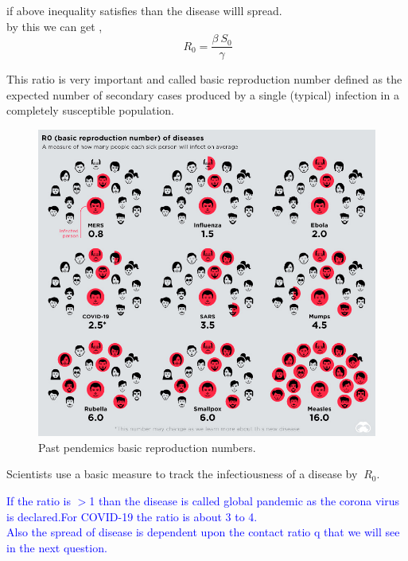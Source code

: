 \documentclass[12pt]{article}
\begin{document}
{\begin{enumerate}
 if above inequality satisfies than  the disease willl spread.
\\
by this we can get ,\\
\begin{equation}
\ R_{0}=\frac{\beta \ S_{0}}{\gamma}
\end{equation}
\par This ratio is very important and called basic reproduction number defined as the expected number of secondary cases produced by a single (typical) infection in a completely susceptible population.
\\
[0.5 cm]
\begin{figure}[H]
\includegraphics[width=15 cm,height=10 cm]{deadliest-pandemics-R0-disease-spread.jpg}
\caption{Past  pendemics basic reproduction numbers.}
\end{figure}
\par Scientists use a basic measure to track the infectiousness of a disease by $\ R_{0}$. 
\\
[1.5 cm]


\begin{tcolorbox}[enhanced,fit to height=4cm,
  colback=yellow!25!black!10!yellow,colframe=green!75!white,title=\textcolor{red}{Conclusion:1},
  drop fuzzy shadow]
  \textcolor{blue}{If the ratio is $>$1 than the disease is called global pandemic as the corona virus is declared.For COVID-19 the ratio is about 3 to 4.\\ Also the spread of disease is dependent upon the contact ratio q that we will see in the next question.} 
\end{tcolorbox}
\newpage



\end{enumerate}}
\end{document}
